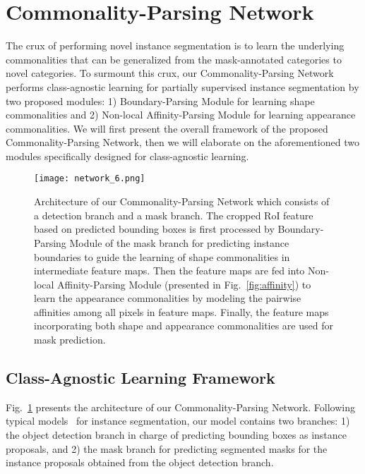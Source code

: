 \documentclass[runningheads]{llncs}
\newcommand{\mymodel}{Commonality-Parsing Network\xspace}
\begin{document}
\section{\mymodel}
\vspace{-2mm}
The crux of performing novel instance segmentation is to learn the underlying commonalities that can be generalized from the mask-annotated categories to novel categories. To surmount this crux, our \mymodel performs class-agnostic learning for partially supervised instance segmentation by two proposed modules: 1) Boundary-Parsing Module for learning shape commonalities and 2) Non-local Affinity-Parsing Module for learning appearance commonalities. We will first present the overall framework of the proposed \mymodel, then we will elaborate on the aforementioned two modules specifically designed for class-agnostic learning.
\begin{figure}[t]
\centering
\texttt{[image: network\_6.png]}
\vspace{-0.15in}
\caption{Architecture of our \mymodel which consists of a detection branch and a mask branch. The cropped RoI feature based on predicted bounding boxes is first processed by Boundary-Parsing Module of the mask branch for predicting instance boundaries to guide the learning of shape commonalities in intermediate feature maps. Then the feature maps are fed into Non-local Affinity-Parsing Module (presented in Fig.~\ref{fig:affinity}) to learn the appearance commonalities by modeling the pairwise affinities among all pixels in feature maps. Finally, the feature maps incorporating both shape and appearance commonalities are used for mask prediction.}
\label{fig:network}
\vspace{-0.2in}
\end{figure}

\vspace{-2mm}
\subsection{Class-Agnostic Learning Framework}
\vspace{-1mm}
Fig.~\ref{fig:network} presents the architecture of our \mymodel. Following typical models~\cite{chen2018masklab,he2017mask,liu2018path} for instance segmentation, our model contains two branches: 1) the object detection branch in charge of predicting bounding boxes as instance proposals, and 2) the mask branch for predicting segmented masks for the instance proposals obtained from the object detection branch. 
\end{document}

